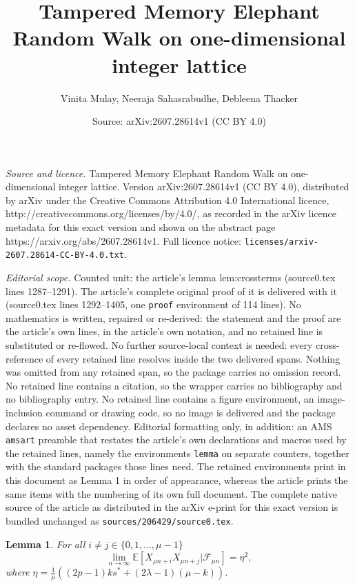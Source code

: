 \documentclass[10pt,a4paper]{amsart}
\title{Tampered Memory Elephant Random Walk on one-dimensional integer lattice}
\author{Vinita Mulay, Neeraja Sahasrabudhe, Debleena Thacker}
\date{Source: arXiv:2607.28614v1 (CC BY 4.0)}
\newtheorem{lemma}{Lemma}
\newcommand{\E}{\mbox{${\mathbb E}$}}
\newcommand{\FF}{\mbox{${\mathcal F}$}}
\begin{document}
\maketitle

\noindent\emph{Source and licence.} Tampered Memory Elephant Random Walk on one-dimensional integer lattice. Version arXiv:2607.28614v1 (CC BY 4.0), distributed by arXiv under the Creative Commons Attribution 4.0 International licence, http://creativecommons.org/licenses/by/4.0/, as recorded in the arXiv licence metadata for this exact version and shown on the abstract page https://arxiv.org/abs/2607.28614v1. Full licence notice: \texttt{licenses/arxiv-2607.28614-CC-BY-4.0.txt}.\par\smallskip

\noindent\textit{Editorial scope.} Counted unit: the article's lemma lem:crossterms (source0.tex lines 1287--1291). The article's complete original proof of it is delivered with it (source0.tex lines 1292--1405, one \texttt{proof} environment of 114 lines). No mathematics is written, repaired or re-derived: the statement and the proof are the article's own lines, in the article's own notation, and no retained line is substituted or re-flowed.  No further source-local context is needed: every cross-reference of every retained line resolves inside the two delivered spans.  Nothing was omitted from any retained span, so the package carries no omission record.  No retained line contains a citation, so the wrapper carries no bibliography and no bibliography entry.  No retained line contains a figure environment, an image-inclusion command or drawing code, so no image is delivered and the package declares no asset dependency.  Editorial formatting only, in addition: an AMS \texttt{amsart} preamble that restates the article's own declarations and macros used by the retained lines, namely the environments \texttt{lemma} on separate counters, together with the standard packages those lines need.  The retained environments print in this document as Lemma 1 in order of appearance, whereas the article prints the same items with the numbering of its own full document.  The complete native source of the article as distributed in the arXiv e-print for this exact version is bundled unchanged as \texttt{sources/206429/source0.tex}.
\begin{lemma} \label{lem:crossterms}
For all $i \neq j \in \{0, 1, \dots, \mu-1 \}$
\[ \lim_{n \to \infty} \E\left[ X_{\mu n+i} X_{\mu n+j} \vert \FF_{\mu n} \right] = \eta^2, \]
where $\eta = \frac{1}{\mu}((2p-1){k}s^* +(2\lambda-1)(\mu-k))$. 
\end{lemma}
\end{document}
